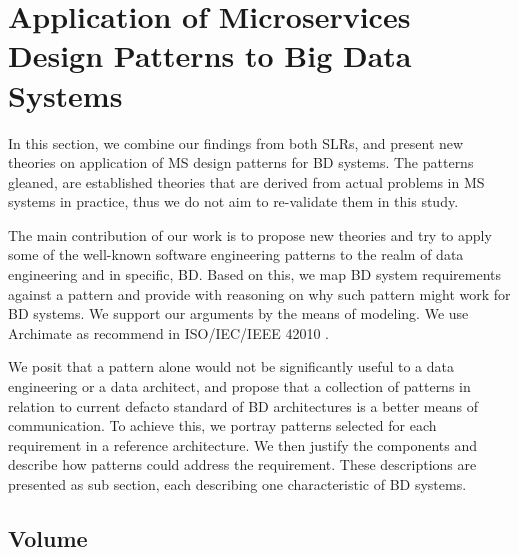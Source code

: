 \documentclass{bmcart}
\begin{document}

\section{Application of Microservices Design Patterns to Big Data Systems} \label{Mapping}


In this section, we combine our findings from both SLRs, and present new theories on application of MS design patterns for BD systems. The patterns gleaned, are established theories that are derived from actual problems in MS systems in practice, thus we do not aim to re-validate them in this study. 

The main contribution of our work is to propose new theories and try to apply some of the well-known software engineering patterns to the realm of data engineering and in specific, BD. Based on this, we map BD system requirements against a pattern and provide with reasoning on why such pattern might work for BD systems. We support our arguments by the means of modeling. We use Archimate \cite{lankhorst2013language} as recommend in ISO/IEC/IEEE 42010 \cite{Chaabane}. 


We posit that a pattern alone would not be significantly useful to a data engineering or a data architect, and propose that a collection of patterns in relation to current defacto standard of BD architectures is a better means of communication. To achieve this, we portray patterns selected for each requirement in a reference architecture. We then justify the components and describe how patterns could address the requirement. These descriptions are presented as sub section, each describing one characteristic of BD systems. 


\subsection{Volume} \label{volume}

\end{document}
